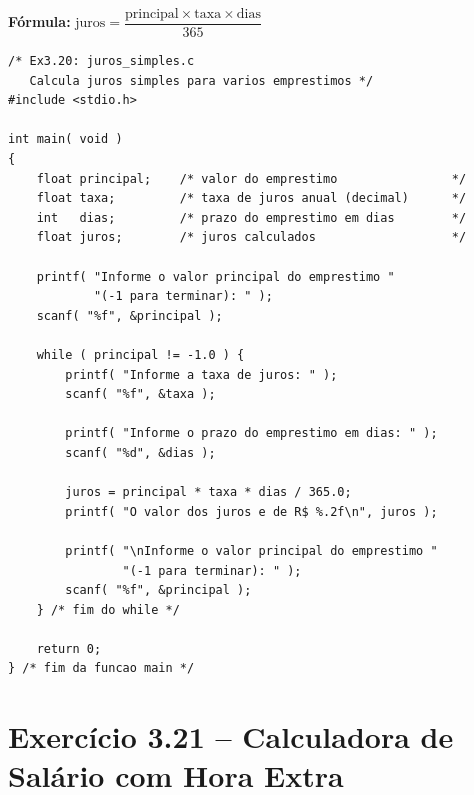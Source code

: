 \documentclass[12pt,a4paper]{article}
\begin{document}
\begin{respostabox}
\textbf{Fórmula:} \quad
$\text{juros} = \dfrac{\text{principal} \times \text{taxa} \times \text{dias}}{365}$

\begin{lstlisting}
/* Ex3.20: juros_simples.c
   Calcula juros simples para varios emprestimos */
#include <stdio.h>

int main( void )
{
    float principal;    /* valor do emprestimo                */
    float taxa;         /* taxa de juros anual (decimal)      */
    int   dias;         /* prazo do emprestimo em dias        */
    float juros;        /* juros calculados                   */

    printf( "Informe o valor principal do emprestimo "
            "(-1 para terminar): " );
    scanf( "%f", &principal );

    while ( principal != -1.0 ) {
        printf( "Informe a taxa de juros: " );
        scanf( "%f", &taxa );

        printf( "Informe o prazo do emprestimo em dias: " );
        scanf( "%d", &dias );

        juros = principal * taxa * dias / 365.0;
        printf( "O valor dos juros e de R$ %.2f\n", juros );

        printf( "\nInforme o valor principal do emprestimo "
                "(-1 para terminar): " );
        scanf( "%f", &principal );
    } /* fim do while */

    return 0;
} /* fim da funcao main */
\end{lstlisting}
\end{respostabox}

\newpage

\section{Exercício 3.21 -- Calculadora de Salário com Hora Extra}
\end{document}
